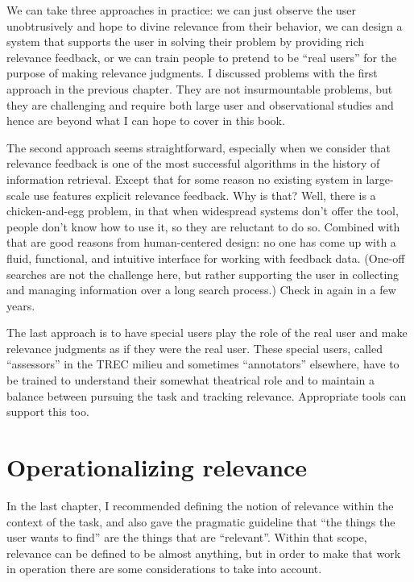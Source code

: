 \documentclass[nobib]{tufte-book}
\begin{document}
We can take three approaches in practice: we can just observe the user unobtrusively and hope to divine relevance from their behavior, we can design a system that supports the user in solving their problem by providing rich relevance feedback, or we can train people to pretend to be ``real users'' for the purpose of making relevance judgments.  I discussed problems with the first approach in the previous chapter.  They are not insurmountable problems, but they are challenging and require both large user and observational studies and hence are beyond what I can hope to cover in this book.

The second approach seems straightforward, especially when we consider that relevance feedback is one of the most successful algorithms in the history of information retrieval.  Except that for some reason no existing system in large-scale use features explicit relevance feedback.  Why is that?  Well, there is a chicken-and-egg problem, in that when widespread systems don't offer the tool, people don't know how to use it, so they are reluctant to do so.  Combined with that are good reasons from human-centered design: no one has come up with a fluid, functional, and intuitive interface for working with feedback data.  (One-off searches are not the challenge here, but rather supporting the user in collecting and managing information over a long search process.)  Check in again in a few years.

The last approach is to have special users play the role of the real user and make relevance judgments as if they were the real user.  These special users, called ``assessors'' in the TREC milieu and sometimes ``annotators'' elsewhere, have to be trained to understand their somewhat theatrical role and to maintain a balance between pursuing the task and tracking relevance.  Appropriate tools can support this too.

\section{Operationalizing relevance}

In the last chapter, I recommended defining the notion of relevance within the context of the task, and also gave the pragmatic guideline that ``the things the user wants to find'' are the things that are ``relevant''.  Within that scope, relevance can be defined to be almost anything, but in order to make that work in operation there are some considerations to take into account.
\end{document}
